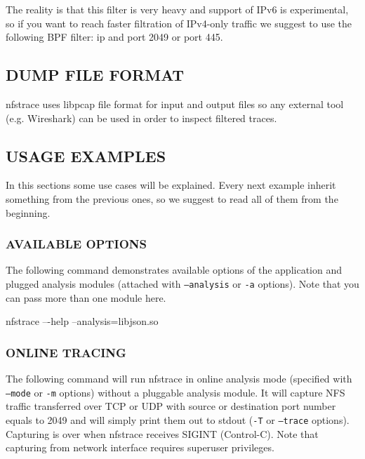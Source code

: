 \documentclass{article}
\newcommand*{\textfile}[1]{\textsf{#1}}
\newcommand*{\textprog}[1]{\textfile{#1}}
\newcommand{\code}[1]{\texttt{#1}}
\begin{document}
The reality is that this filter is very heavy and support of IPv6 is
experimental, so if you want to reach faster filtration of IPv4-only traffic we
suggest to use the following \gls{BPF} filter: \textprog{ip and port 2049 or port
445}.

\subsection{DUMP FILE FORMAT}
\label{sec:dumpfileformat}

\textprog{nfstrace} uses libpcap file format for input and output files so any
external tool (e.g. \gls{Wireshark}) can be used in order to inspect filtered
traces.

\subsection{USAGE EXAMPLES}

In this sections some use cases will be explained. Every next example inherit
something from the previous ones, so we suggest to read all of them from the
beginning.  

\subsubsection{AVAILABLE OPTIONS}

The following command demonstrates available options of the application and
plugged analysis modules (attached with \code{--analysis} or \code{-a} options). Note that
you can pass more than one module here.
\begin{CodeListing}
nfstrace –-help --analysis=libjson.so
\end{CodeListing}

\subsubsection{ONLINE TRACING}

The following command will run \textprog{nfstrace} in online analysis mode (specified with
\code{--mode} or \code{-m} options) without a pluggable analysis module. It will capture
\gls{NFS} traffic transferred over TCP or UDP with source or destination port
number equals to 2049 and will simply print them out to stdout (\code{-T} or \code{--trace}
options). Capturing is over when \textprog{nfstrace} receives \textprog{SIGINT} (Control-C).  Note
that capturing from network interface requires superuser privileges.
\end{document}
